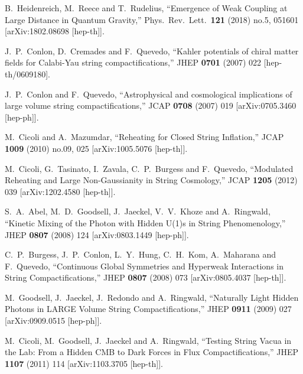 \documentclass[11pt,a4paper]{article}
\begin{document}
\begin{itemize}
\begin{thebibliography}{99}
  B.~Heidenreich, M.~Reece and T.~Rudelius,
  ``Emergence of Weak Coupling at Large Distance in Quantum Gravity,''
  Phys.\ Rev.\ Lett.\  {\bf 121} (2018) no.5,  051601
  [arXiv:1802.08698 [hep-th]].

  J.~P.~Conlon, D.~Cremades and F.~Quevedo,
  ``Kahler potentials of chiral matter fields for Calabi-Yau string compactifications,''
  JHEP {\bf 0701} (2007) 022
  [hep-th/0609180].
 
  J.~P.~Conlon and F.~Quevedo,
  ``Astrophysical and cosmological implications of large volume string compactifications,''
  JCAP {\bf 0708} (2007) 019
  [arXiv:0705.3460 [hep-ph]].

  M.~Cicoli and A.~Mazumdar,
  ``Reheating for Closed String Inflation,''
  JCAP {\bf 1009} (2010) no.09,  025
  [arXiv:1005.5076 [hep-th]].

  M.~Cicoli, G.~Tasinato, I.~Zavala, C.~P.~Burgess and F.~Quevedo,
  ``Modulated Reheating and Large Non-Gaussianity in String Cosmology,''
  JCAP {\bf 1205} (2012) 039
  [arXiv:1202.4580 [hep-th]].

  S.~A.~Abel, M.~D.~Goodsell, J.~Jaeckel, V.~V.~Khoze and A.~Ringwald,
  ``Kinetic Mixing of the Photon with Hidden U(1)s in String Phenomenology,''
  JHEP {\bf 0807} (2008) 124
  [arXiv:0803.1449 [hep-ph]].
  
  C.~P.~Burgess, J.~P.~Conlon, L.~Y.~Hung, C.~H.~Kom, A.~Maharana and F.~Quevedo,
  ``Continuous Global Symmetries and Hyperweak Interactions in String Compactifications,''
  JHEP {\bf 0807} (2008) 073
  [arXiv:0805.4037 [hep-th]].

  M.~Goodsell, J.~Jaeckel, J.~Redondo and A.~Ringwald,
  ``Naturally Light Hidden Photons in LARGE Volume String Compactifications,''
  JHEP {\bf 0911} (2009) 027
  [arXiv:0909.0515 [hep-ph]].

  M.~Cicoli, M.~Goodsell, J.~Jaeckel and A.~Ringwald,
  ``Testing String Vacua in the Lab: From a Hidden CMB to Dark Forces in Flux Compactifications,''
  JHEP {\bf 1107} (2011) 114
  [arXiv:1103.3705 [hep-th]].
	

\end{thebibliography}
\end{itemize}
\end{document}
